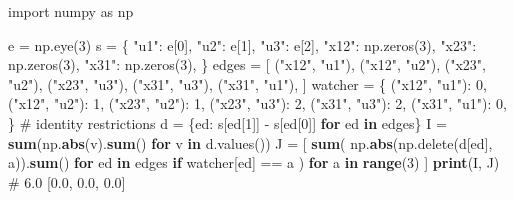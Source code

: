 \documentclass[
  11pt,
]{article}
\newenvironment{Shaded}{\begin{snugshade}}{\end{snugshade}}
\newcommand{\BuiltInTok}[1]{\textcolor[rgb]{0.39,0.29,0.61}{\textbf{#1}}}
\newcommand{\CommentTok}[1]{\textcolor[rgb]{0.54,0.53,0.53}{#1}}
\newcommand{\ControlFlowTok}[1]{\textcolor[rgb]{0.12,0.11,0.11}{\textbf{#1}}}
\newcommand{\DecValTok}[1]{\textcolor[rgb]{0.69,0.50,0.00}{#1}}
\newcommand{\ImportTok}[1]{\textcolor[rgb]{1.00,0.33,0.00}{#1}}
\newcommand{\KeywordTok}[1]{\textcolor[rgb]{0.12,0.11,0.11}{\textbf{#1}}}
\newcommand{\NormalTok}[1]{\textcolor[rgb]{0.12,0.11,0.11}{#1}}
\newcommand{\OperatorTok}[1]{\textcolor[rgb]{0.12,0.11,0.11}{#1}}
\newcommand{\StringTok}[1]{\textcolor[rgb]{0.75,0.01,0.01}{#1}}
\begin{document}
\begin{Shaded}
\begin{Highlighting}[]
\ImportTok{import}\NormalTok{ numpy }\ImportTok{as}\NormalTok{ np}

\NormalTok{e }\OperatorTok{=}\NormalTok{ np.eye(}\DecValTok{3}\NormalTok{)}
\NormalTok{s }\OperatorTok{=}\NormalTok{ \{}
    \StringTok{"u1"}\NormalTok{: e[}\DecValTok{0}\NormalTok{],}
    \StringTok{"u2"}\NormalTok{: e[}\DecValTok{1}\NormalTok{],}
    \StringTok{"u3"}\NormalTok{: e[}\DecValTok{2}\NormalTok{],}
    \StringTok{"x12"}\NormalTok{: np.zeros(}\DecValTok{3}\NormalTok{),}
    \StringTok{"x23"}\NormalTok{: np.zeros(}\DecValTok{3}\NormalTok{),}
    \StringTok{"x31"}\NormalTok{: np.zeros(}\DecValTok{3}\NormalTok{),}
\NormalTok{\}}
\NormalTok{edges }\OperatorTok{=}\NormalTok{ [}
\NormalTok{    (}\StringTok{"x12"}\NormalTok{, }\StringTok{"u1"}\NormalTok{),}
\NormalTok{    (}\StringTok{"x12"}\NormalTok{, }\StringTok{"u2"}\NormalTok{),}
\NormalTok{    (}\StringTok{"x23"}\NormalTok{, }\StringTok{"u2"}\NormalTok{),}
\NormalTok{    (}\StringTok{"x23"}\NormalTok{, }\StringTok{"u3"}\NormalTok{),}
\NormalTok{    (}\StringTok{"x31"}\NormalTok{, }\StringTok{"u3"}\NormalTok{),}
\NormalTok{    (}\StringTok{"x31"}\NormalTok{, }\StringTok{"u1"}\NormalTok{),}
\NormalTok{]}
\NormalTok{watcher }\OperatorTok{=}\NormalTok{ \{}
\NormalTok{    (}\StringTok{"x12"}\NormalTok{, }\StringTok{"u1"}\NormalTok{): }\DecValTok{0}\NormalTok{,}
\NormalTok{    (}\StringTok{"x12"}\NormalTok{, }\StringTok{"u2"}\NormalTok{): }\DecValTok{1}\NormalTok{,}
\NormalTok{    (}\StringTok{"x23"}\NormalTok{, }\StringTok{"u2"}\NormalTok{): }\DecValTok{1}\NormalTok{,}
\NormalTok{    (}\StringTok{"x23"}\NormalTok{, }\StringTok{"u3"}\NormalTok{): }\DecValTok{2}\NormalTok{,}
\NormalTok{    (}\StringTok{"x31"}\NormalTok{, }\StringTok{"u3"}\NormalTok{): }\DecValTok{2}\NormalTok{,}
\NormalTok{    (}\StringTok{"x31"}\NormalTok{, }\StringTok{"u1"}\NormalTok{): }\DecValTok{0}\NormalTok{,}
\NormalTok{\}}
\CommentTok{\# identity restrictions}
\NormalTok{d }\OperatorTok{=}\NormalTok{ \{ed: s[ed[}\DecValTok{1}\NormalTok{]] }\OperatorTok{{-}}\NormalTok{ s[ed[}\DecValTok{0}\NormalTok{]] }\ControlFlowTok{for}\NormalTok{ ed }\KeywordTok{in}\NormalTok{ edges\}}
\NormalTok{I }\OperatorTok{=} \BuiltInTok{sum}\NormalTok{(np.}\BuiltInTok{abs}\NormalTok{(v).}\BuiltInTok{sum}\NormalTok{() }\ControlFlowTok{for}\NormalTok{ v }\KeywordTok{in}\NormalTok{ d.values())}
\NormalTok{J }\OperatorTok{=}\NormalTok{ [}
    \BuiltInTok{sum}\NormalTok{(}
\NormalTok{        np.}\BuiltInTok{abs}\NormalTok{(np.delete(d[ed], a)).}\BuiltInTok{sum}\NormalTok{()}
        \ControlFlowTok{for}\NormalTok{ ed }\KeywordTok{in}\NormalTok{ edges}
        \ControlFlowTok{if}\NormalTok{ watcher[ed] }\OperatorTok{==}\NormalTok{ a}
\NormalTok{    )}
    \ControlFlowTok{for}\NormalTok{ a }\KeywordTok{in} \BuiltInTok{range}\NormalTok{(}\DecValTok{3}\NormalTok{)}
\NormalTok{]}
\BuiltInTok{print}\NormalTok{(I, J)  }\CommentTok{\# 6.0 [0.0, 0.0, 0.0]}
\end{Highlighting}
\end{Shaded}
\end{document}

